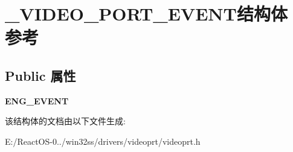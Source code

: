 \hypertarget{struct___v_i_d_e_o___p_o_r_t___e_v_e_n_t}{}\section{\+\_\+\+V\+I\+D\+E\+O\+\_\+\+P\+O\+R\+T\+\_\+\+E\+V\+E\+N\+T结构体 参考}
\label{struct___v_i_d_e_o___p_o_r_t___e_v_e_n_t}
\subsection*{Public 属性}
\begin{DoxyCompactItemize}
\item 
\mbox{\label{struct___v_i_d_e_o___p_o_r_t___e_v_e_n_t_a331eebf88947ac5b8131627b74794dea}} 
{\bfseries E\+N\+G\+\_\+\+E\+V\+E\+NT}
\end{DoxyCompactItemize}


该结构体的文档由以下文件生成\+:\begin{DoxyCompactItemize}
\item 
E\+:/\+React\+O\+S-\/0../win32ss/drivers/videoprt/videoprt.\+h\end{DoxyCompactItemize}
